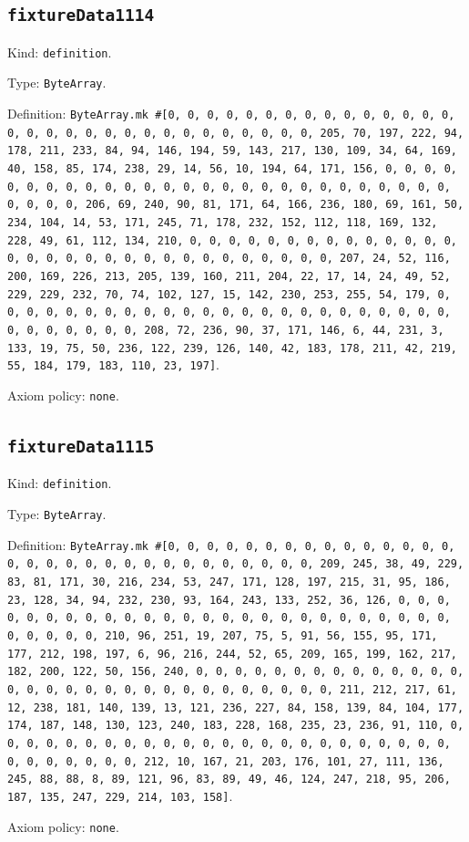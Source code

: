 \documentclass[11pt]{article}
\begin{document}
\subsection*{\texttt{fixtureData1114}}
\noindent Kind: \texttt{definition}.\par
\noindent Type: \texttt{ByteArray}.\par
\noindent Definition: \texttt{ByteArray.mk \#[0, 0, 0, 0, 0, 0, 0, 0, 0, 0, 0, 0, 0, 0, 0, 0, 0, 0, 0, 0, 0, 0, 0, 0, 0, 0, 0, 0, 0, 0, 0, 205, 70, 197, 222, 94, 178, 211, 233, 84, 94, 146, 194, 59, 143, 217, 130, 109, 34, 64, 169, 40, 158, 85, 174, 238, 29, 14, 56, 10, 194, 64, 171, 156, 0, 0, 0, 0, 0, 0, 0, 0, 0, 0, 0, 0, 0, 0, 0, 0, 0, 0, 0, 0, 0, 0, 0, 0, 0, 0, 0, 0, 0, 0, 0, 206, 69, 240, 90, 81, 171, 64, 166, 236, 180, 69, 161, 50, 234, 104, 14, 53, 171, 245, 71, 178, 232, 152, 112, 118, 169, 132, 228, 49, 61, 112, 134, 210, 0, 0, 0, 0, 0, 0, 0, 0, 0, 0, 0, 0, 0, 0, 0, 0, 0, 0, 0, 0, 0, 0, 0, 0, 0, 0, 0, 0, 0, 0, 0, 207, 24, 52, 116, 200, 169, 226, 213, 205, 139, 160, 211, 204, 22, 17, 14, 24, 49, 52, 229, 229, 232, 70, 74, 102, 127, 15, 142, 230, 253, 255, 54, 179, 0, 0, 0, 0, 0, 0, 0, 0, 0, 0, 0, 0, 0, 0, 0, 0, 0, 0, 0, 0, 0, 0, 0, 0, 0, 0, 0, 0, 0, 0, 0, 208, 72, 236, 90, 37, 171, 146, 6, 44, 231, 3, 133, 19, 75, 50, 236, 122, 239, 126, 140, 42, 183, 178, 211, 42, 219, 55, 184, 179, 183, 110, 23, 197]}.\par
\noindent Axiom policy: \texttt{none}.\par
\subsection*{\texttt{fixtureData1115}}
\noindent Kind: \texttt{definition}.\par
\noindent Type: \texttt{ByteArray}.\par
\noindent Definition: \texttt{ByteArray.mk \#[0, 0, 0, 0, 0, 0, 0, 0, 0, 0, 0, 0, 0, 0, 0, 0, 0, 0, 0, 0, 0, 0, 0, 0, 0, 0, 0, 0, 0, 0, 0, 209, 245, 38, 49, 229, 83, 81, 171, 30, 216, 234, 53, 247, 171, 128, 197, 215, 31, 95, 186, 23, 128, 34, 94, 232, 230, 93, 164, 243, 133, 252, 36, 126, 0, 0, 0, 0, 0, 0, 0, 0, 0, 0, 0, 0, 0, 0, 0, 0, 0, 0, 0, 0, 0, 0, 0, 0, 0, 0, 0, 0, 0, 0, 0, 210, 96, 251, 19, 207, 75, 5, 91, 56, 155, 95, 171, 177, 212, 198, 197, 6, 96, 216, 244, 52, 65, 209, 165, 199, 162, 217, 182, 200, 122, 50, 156, 240, 0, 0, 0, 0, 0, 0, 0, 0, 0, 0, 0, 0, 0, 0, 0, 0, 0, 0, 0, 0, 0, 0, 0, 0, 0, 0, 0, 0, 0, 0, 0, 211, 212, 217, 61, 12, 238, 181, 140, 139, 13, 121, 236, 227, 84, 158, 139, 84, 104, 177, 174, 187, 148, 130, 123, 240, 183, 228, 168, 235, 23, 236, 91, 110, 0, 0, 0, 0, 0, 0, 0, 0, 0, 0, 0, 0, 0, 0, 0, 0, 0, 0, 0, 0, 0, 0, 0, 0, 0, 0, 0, 0, 0, 0, 0, 212, 10, 167, 21, 203, 176, 101, 27, 111, 136, 245, 88, 88, 8, 89, 121, 96, 83, 89, 49, 46, 124, 247, 218, 95, 206, 187, 135, 247, 229, 214, 103, 158]}.\par
\noindent Axiom policy: \texttt{none}.\par
\end{document}
